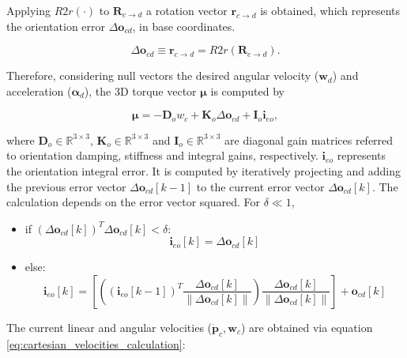 Applying $R2r(\cdot)$ to $\boldsymbol{R}_{c\to d}$ a rotation vector $\boldsymbol{r}_{c\to d}$ is obtained,
which represents the orientation error $\Delta \boldsymbol{o}_{cd}$, in base coordinates.

\begin{equation}
    \Delta \boldsymbol{o}_{cd} \equiv \boldsymbol{r}_{c\to d} = R2r(\boldsymbol{R}_{c\to d}). 
\end{equation}

Therefore, considering null vectors the desired angular
velocity ($\boldsymbol{w}_d$) and acceleration ($\boldsymbol{\alpha}_d$), the 3D torque vector $\boldsymbol{\mu}$ is computed by

\begin{equation}
    \boldsymbol{\mu} = -\boldsymbol{D}_o w_c + \boldsymbol{K}_o \Delta \boldsymbol{o}_{cd} + \boldsymbol{I}_o \boldsymbol{i}_{eo},
\end{equation}

where $\boldsymbol{D}_o \in \mathbb{R}^{3\times3}$, $\boldsymbol{K}_o \in \mathbb{R}^{3\times3}$ and $\boldsymbol{I}_o \in \mathbb{R}^{3\times3}$ are diagonal gain matrices referred to orientation damping, stiffness and integral gains, respectively. $\boldsymbol{i}_{eo}$ represents the orientation integral error. It is computed by iteratively projecting and adding the previous error vector $\Delta \boldsymbol{o}_{cd}[k-1]$ to the current error vector $\Delta \boldsymbol{o}_{cd}[k]$. The calculation depends on the error vector squared. For $\delta \ll 1$,

\begin{itemize}
    \item if $(\Delta \boldsymbol{o}_{cd}[k])^T \Delta \boldsymbol{o}_{cd}[k] < \delta$:
        \begin{equation}
            \boldsymbol{i}_{eo}[k] = \Delta \boldsymbol{o}_{cd}[k]
        \end{equation}
        
    \item else:
        \begin{equation}
            \boldsymbol{i}_{eo}[k] = \left[ \left( (\boldsymbol{i}_{eo}[k-1])^T \frac{\Delta \boldsymbol{o}_{cd}[k]}{\| \Delta \boldsymbol{o}_{cd}[k] \|} \right) \frac{\Delta \boldsymbol{o}_{cd}[k]}{\| \Delta \boldsymbol{o}_{cd}[k] \|} \right] + \boldsymbol{o}_{cd}[k]
        \end{equation}
\end{itemize}

The current linear and angular velocities ($\boldsymbol{\dot{p}}_c, \boldsymbol{w}_c$) are obtained via equation \ref{eq:cartesian_velocities_calculation}:

